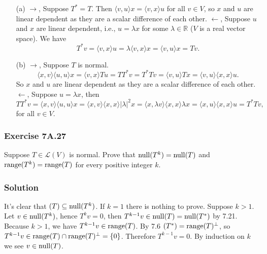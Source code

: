 \begin{itemize}
    \item[(a)] $\rightarrow$, Suppose $T^* = T$.
        Then $\langle v, u \rangle x = \langle v, x \rangle u$ for all $v \in V$, so $x$ and $u$ are linear dependent as they are a scalar difference of each other.
        $\leftarrow$, Suppose $u$ and $x$ are linear dependent, i.e., $u = \lambda x$ for some $\lambda \in \mathbb{R}$ ($V$ is a real vector space).
        We have
        \begin{equation*}
            T^*v = \langle v, x \rangle u
                = \lambda \langle v, x \rangle x
                = \langle v, u \rangle x
                = Tv.
        \end{equation*}
    \item[(b)] $\rightarrow$, Suppose $T$ is normal.
        \begin{equation*}
            \langle x, v \rangle \langle u, u \rangle x
                = \langle v, x \rangle Tu
                = TT^* v
                = T^*T v
                = \langle v, u \rangle Tx
                = \langle v, u \rangle \langle x, x \rangle u.
        \end{equation*}
        So $x$ and $u$ are linear dependent as they are a scalar difference of each other.
        $\leftarrow$, Suppose $u = \lambda x$, then
        \begin{equation*}
            TT^*v
                = \langle x, v \rangle \langle u, u \rangle x
                = \langle x, v \rangle \langle x, x \rangle |\lambda|^2 x
                = \langle x, \lambda v \rangle \langle x, x \rangle \lambda x
                = \langle x, u \rangle \langle x, x \rangle u
                = T^*Tv,
        \end{equation*}
        for all $v \in V$.
\end{itemize}


\subsubsection*{Exercise 7A.27}

Suppose $T \in \mathcal{L}(V)$ is normal.
Prove that $\mathrm{null}(T^k) = \mathrm{null}(T)$ and $\mathrm{range}(T^k) = \mathrm{range}(T)$ for every positive integer $k$.

\subsubsection*{Solution}

It's clear that $\null(T) \subseteq \nnull(T^k)$.
If $k = 1$ there is nothing to prove.
Suppose $k > 1$.
Let $v \in \mathrm{null}(T^k)$, hence $T^k v = 0$, then $T^{k-1}v \in \mathrm{null}(T) = \mathrm{null}(T^*)$ by 7.21.
Because $k > 1$, we have $T^{k-1}v \in \mathrm{range}(T)$.
By 7.6 $\null(T^*) = \range(T)^{\perp}$, so $T^{k-1}v \in \mathrm{range}(T) \cap \mathrm{range}(T)^{\perp} = \{0\}$.
Therefore $T^{k-1}v = 0$.
By induction on $k$ we see $v \in \mathrm{null}(T)$.

